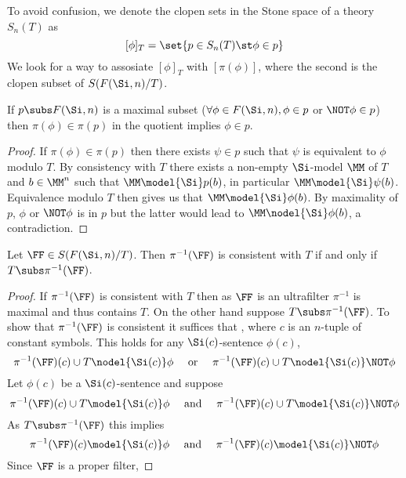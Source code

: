 \begin{nttn}
    To avoid confusion, 
    we denote the clopen sets in the Stone space of a theory $S_n(T)$ as
    \[[\phi]_T = \set{p \in S_n(T) \st \phi \in p}\]
    We look for a way to assosiate $[\phi]_T$ with $[\pi(\phi)]$,
    where the second is the clopen subset of $S(F(\Si,n) / T)$.
\end{nttn}

\begin{lem}
    If $p \subs F(\Si,n)$ is a maximal subset 
    ($\forall \phi \in F(\Si,n), \phi \in p$ or $\NOT \phi \in p$) then 
    $\pi(\phi) \in \pi(p)$ in the quotient implies $\phi \in p$.
\end{lem}
\begin{proof}
    If $\pi(\phi) \in \pi(p)$ then there exists $\psi \in p$ such that 
    $\psi$ is equivalent to $\phi$ modulo $T$.
    By consistency with $T$ there exists a non-empty $\Si$-model $\MM$ of $T$
    and $b \in {\MM}^n$ 
    such that $\MM \model{\Si} p(b)$, 
    in particular $\MM \model{\Si} \psi(b)$.
    Equivalence modulo $T$ then gives us that $\MM \model{\Si} \phi(b)$.
    By maximality of $p$, 
    $\phi$ or $\NOT \phi$ is in $p$ but the latter would lead to 
    $\MM \nodel{\Si} \phi(b)$, 
    a contradiction.
\end{proof}

\begin{lem}
    Let $\FF \in S(F(\Si,n) / T)$.
    Then $\pi^{-1}(\FF)$ is consistent with $T$ if and only if 
    $T \subs \pi^{-1}(\FF)$. 
\end{lem}
\begin{proof}
    If $\pi^{-1}(\FF)$ is consistent with $T$ then as $\FF$ is an ultrafilter
    $\pi^{-1}$ is maximal and thus contains $T$.
    On the other hand suppose $T \subs \pi^{-1}(\FF)$.
    To show that $\pi^{-1}(\FF)$ is consistent it suffices that 
    , 
    where $c$ is an $n$-tuple of constant symbols.
    This holds  
    for any $\Si(c)$-sentence $\phi(c)$,
    \[\pi^{-1}(\FF)(c) \cup T \nodel{\Si(c)} \phi 
    \quad \text{ or } \quad
    \pi^{-1}(\FF)(c) \cup T \nodel{\Si(c)} \NOT \phi\]
    Let $\phi(c)$ be a $\Si(c)$-sentence and suppose 
    \[\pi^{-1}(\FF)(c) \cup T \model{\Si(c)} \phi 
    \quad \text{ and } \quad
    \pi^{-1}(\FF)(c) \cup T \model{\Si(c)} \NOT \phi\]
    As $T \subs \pi^{-1}(\FF)$ this implies 
    \[\pi^{-1}(\FF)(c) \model{\Si(c)} \phi 
    \quad \text{ and } \quad
    \pi^{-1}(\FF)(c) \model{\Si(c)} \NOT \phi\]
    Since $\FF$ is a proper filter, 
\end{proof}


